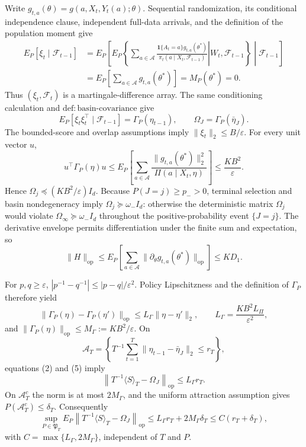 Write \(g_{t,a}(\theta)=g(a,X_t,Y_t(a);\theta)\).  Sequential randomization,
its conditional independence clause, independent full-data arrivals, and the
definition of the population moment give
\[
 \begin{aligned}
 E_P[\xi_t\mid\mathcal F_{t-1}]
 &=E_P\!\left[
 E_P\!\left\{\left.\sum_{a\in\mathcal A}
 \frac{\mathbf1\{A_t=a\}g_{t,a}(\theta^*)}
 {\pi_t(a\mid X_t,\mathcal F_{t-1})}
 \right|W_t,\mathcal F_{t-1}\right\}
 \middle|\mathcal F_{t-1}\right]\\
 &=E_P\!\left[\sum_{a\in\mathcal A}g_{t,a}(\theta^*)\right]
 =M_P(\theta^*)=0.
 \end{aligned}
\tag{1}
\]
Thus \((\xi_t,\mathcal F_t)\) is a martingale-difference array.  The same
conditioning calculation and \(\mathrm{def:basin\text{-}covariance}\) give
\[
 E_P[\xi_t\xi_t^\top\mid\mathcal F_{t-1}]
 =\Gamma_P(\eta_{t-1}),
 \qquad \Omega_J=\Gamma_P(\bar\eta_J).
\tag{2}
\]
The bounded-score and overlap assumptions imply \(\|\xi_t\|_2\le B/\varepsilon\).
For every unit vector \(u\),
\[
 u^\top\Gamma_P(\eta)u
 \le E_P\!\left[\sum_{a\in\mathcal A}
 \frac{\|g_{t,a}(\theta^*)\|_2^2}{\Pi(a\mid X_t,\eta)}\right]
 \le\frac{KB^2}{\varepsilon}.
\tag{3}
\]
Hence \(\Omega_j\preceq(KB^2/\varepsilon)I_d\).  Because
\(P(J=j)\ge p_->0\), terminal selection and basin nondegeneracy imply
\(\Omega_j\succeq\omega_-I_d\): otherwise the deterministic matrix
\(\Omega_j\) would violate \(\Omega_\infty\succeq\omega_-I_d\) throughout
the positive-probability event \(\{J=j\}\).  The derivative envelope permits
differentiation under the finite sum and expectation, so
\[
 \|H\|_{\mathrm{op}}
 \le E_P\!\left[\sum_{a\in\mathcal A}
 \|\partial_\theta g_{t,a}(\theta^*)\|_{\mathrm{op}}\right]
 \le KD_1.
\tag{4}
\]

For \(p,q\ge\varepsilon\),
\(|p^{-1}-q^{-1}|\le|p-q|/\varepsilon^2\).  Policy Lipschitzness and the
definition of \(\Gamma_P\) therefore yield
\[
 \|\Gamma_P(\eta)-\Gamma_P(\eta')\|_{\mathrm{op}}
 \le L_\Gamma\|\eta-\eta'\|_2,
 \qquad L_\Gamma=\frac{KB^2L_\Pi}{\varepsilon^2},
\tag{5}
\]
and \(\|\Gamma_P(\eta)\|_{\mathrm{op}}\le M_\Gamma:=KB^2/\varepsilon\).
On
\[
 \mathcal A_T=\left\{T^{-1}\sum_{t=1}^T
 \|\eta_{t-1}-\bar\eta_J\|_2\le r_T\right\},
\]
equations (2) and (5) imply
\[
 \left\|T^{-1}\langle S\rangle_T-\Omega_J\right\|_{\mathrm{op}}
 \le L_\Gamma r_T.
\tag{6}
\]
On \(\mathcal A_T^c\) the norm is at most \(2M_\Gamma\), and the uniform
attraction assumption gives \(P(\mathcal A_T^c)\le\delta_T\).  Consequently
\[
 \sup_{P\in\mathfrak P_T}E_P\left\|T^{-1}\langle S\rangle_T-\Omega_J
 \right\|_{\mathrm{op}}
 \le L_\Gamma r_T+2M_\Gamma\delta_T
 \le C(r_T+\delta_T),
\tag{7}
\]
with \(C=\max\{L_\Gamma,2M_\Gamma\}\), independent of \(T\) and \(P\).

